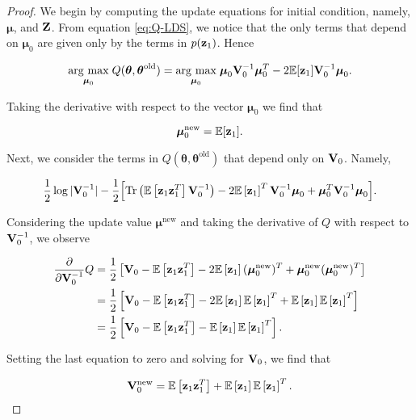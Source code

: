 \documentclass[11pt]{article}
\numberwithin{equation}{section}
\newcommand{\argmax}[1]{\underset{#1}{\operatorname{arg}\,\operatorname{max}}\;}
\newcommand{\expectation}[1]{\mathbb{E}\left[#1\right]}
\newcommand{\z}{{\bf z}}
\begin{document}
\begin{proof}
	We begin by computing the update equations for initial condition, namely, $\boldsymbol\mu$, and $\bf Z$. From equation \eqref{eq:Q-LDS}, we notice that the only terms that depend on $\boldsymbol{\mu}_0$ are given only by the terms in $p(\z_1)$. Hence

\begin{align}
	\argmax{\boldsymbol{\mu}_0} Q(\boldsymbol\theta, \boldsymbol\theta^\text{old}) = \argmax{\boldsymbol{\mu}_0} \boldsymbol{\mu}_0 {\bf V}_0^{-1}\boldsymbol{\mu}_0^T -2\mathbb{E}[{\z_1}]{\bf V}_0^{-1}\boldsymbol{\mu}_0.
\end{align}

Taking the derivative with respect to the vector $\boldsymbol{\mu}_0$ we find that

\begin{equation}
	\boldsymbol{\mu}_0^\text{new} = \mathbb{E}[{\z_1}].
\end{equation}

Next, we consider the terms in $Q(\boldsymbol\theta, \boldsymbol\theta^\text{old})$ that depend only on ${\bf V}_0$. Namely,

\begin{equation}
	\frac{1}{2}\log \vert
	  {\bf V}_0^{-1}\vert -\frac{1}{2}\Big[\text{Tr}\left(\mathbb{E}\left[\z_1 \z_1^T\right] {\bf V}_0^{-1}\right) -2 \mathbb{E}\left[\z_1\right]^T{\bf V}_0^{-1}\boldsymbol\mu_0 + \boldsymbol\mu_0^T {\bf V}_0^{-1}\boldsymbol\mu_0\Big].
\end{equation}

Considering the update value $\boldsymbol{\mu}^\text{new}$ and taking the derivative of $Q$ with respect to ${\bf V}_0^{-1}$, we observe

\begin{align}
	\frac{\partial}{\partial {\bf V}_0^{-1}} Q &= \frac{1}{2}\left[{\bf V}_0 - \expectation{\z_1 \z_1^T} - 2\expectation{\z_1} (\boldsymbol{\mu}_0^\text{new})^T + \boldsymbol{\mu}_0^\text{new} (\boldsymbol{\mu}_0^\text{new})^T \right] \nonumber \\
	&= \frac{1}{2} \left[{\bf V}_0 - \expectation{\z_1 \z_1^T} - 2\expectation{\z_1}\expectation{\z_1}^T + \expectation{\z_1}\expectation{\z_1}^T \right] \nonumber \\
	&= \frac{1}{2}\left[{\bf V}_0 - \expectation{\z_1 \z_1^T} - \expectation{\z_1}\expectation{\z_1}^T\right].
\end{align}

Setting the last equation to zero and solving for ${\bf V}_0$, we find that

\begin{equation}
	{\bf V}_0^\text{new} = \expectation{\z_1 \z_1^T} + \expectation{\z_1}\expectation{\z_1}^T.
\end{equation}
\end{proof}
\end{document}
